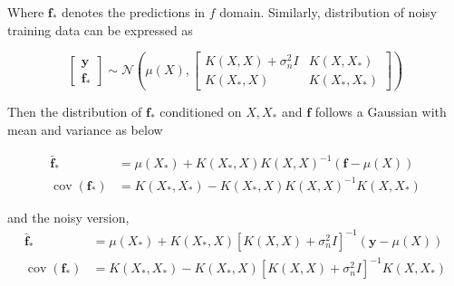 \documentclass[14pt]{report}
\numberwithin{equation}{chapter}
\begin{document}
\begin{spacing}{2}
Where $\mathbf{f}_\ast$ denotes the predictions in $f$ domain. Similarly, distribution of noisy training data can be expressed as

\begin{equation}
\left[\begin{array}{c} 
\mathbf{y}\\
\mathbf{f}_\ast \end{array}
 \right] \sim \mathcal{N} 
 \left(\mu(X), \left[\begin{array}{cc}
 K(X, X) + \sigma_n^2I & K(X, X_\ast)\\
 K(X_\ast, X) & K(X_\ast, X_\ast)
 \end{array}\right]\right)
\end{equation}

Then the distribution of $\mathbf{f}_\ast$ conditioned on $X, X_\ast$ and $\mathbf{f}$ follows a Gaussian with mean and variance as below

\begin{align}
\label{predictive_mean_noise_free}
\bar{\mathbf{f}}_\ast & = \mu(X_\ast) + K(X_\ast, X)K(X,X)^{-1}(\mathbf{f} - \mu(X))
\\
\label{predictive_covariance_noise_free}
\operatorname{cov}(\mathbf{f}_\ast) & = K(X_\ast, X_\ast) - K(X_\ast, X)K(X, X)^{-1}K(X, X_\ast)
\end{align}
 
and the noisy version,
\begin{align}
\bar{\mathbf{f}}_\ast & = \mu(X_\ast) + K(X_\ast, X)[K(X,X) + \sigma_n^2I]^{-1}(\mathbf{y} - \mu (X))
\\
\operatorname{cov}(\mathbf{f}_\ast) & = K(X_\ast, X_\ast) - K(X_\ast, X)[K(X,X) + \sigma_n^2I]^{-1}K(X, X_\ast)
\end{align}

\begin{figure}[h]


\end{figure}
\end{spacing}
\end{document}
